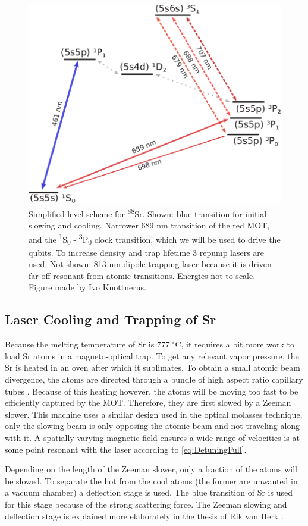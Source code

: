 \begin{figure}
	\centering
	\includegraphics[width=0.55\linewidth]{figures/SrLevel.pdf}
	\caption{Simplified level scheme for \textsuperscript{88}Sr. 
	Shown: blue transition for initial slowing and cooling.
	Narrower 689 nm transition of the red \ac{MOT}, and the \textsuperscript{1}S\textsubscript{0} - \textsuperscript{3}P\textsubscript{0} clock transition, which we will be used to drive the qubits. 
	To increase density and trap lifetime 3 repump lasers are used. 
	Not shown: 813 nm dipole trapping laser because it is driven far-off-resonant from atomic transitions. Energies not to scale. Figure made by Ivo Knottnerus.}
	\label{fig:SrLevel}
\end{figure}

\subsection{Laser Cooling and Trapping of Sr}

Because the melting temperature of Sr is $777$ ${}^{\circ}$C, it requires a bit more work to load Sr atoms in a magneto-optical trap.
To get any relevant vapor pressure, the Sr is heated in an oven after which it sublimates. 
To obtain a small atomic beam divergence, the atoms are directed through a bundle of high aspect ratio capillary tubes \cite{Stellmer2013}. Because of this heating however, the atoms will be moving too fast to be efficiently captured by the MOT.
Therefore, they are first slowed by a Zeeman slower. 
This machine uses a similar design used in the optical molasses technique, only the slowing beam is only opposing the atomic beam and not traveling along with it. 
A spatially varying magnetic field ensures a wide range of velocities is at some point resonant with the laser according to \cref{eq:DetuningFull}. 

Depending on the length of the Zeeman slower, only a fraction of the atoms will be slowed.
To separate the hot from the cool atoms (the former are unwanted in a vacuum chamber) a deflection stage is used. 
The blue transition of Sr is used for this stage because of the strong scattering force. 
The Zeeman slowing and deflection stage is explained more elaborately in the thesis of Rik van Herk \cite{Herk2022}.

